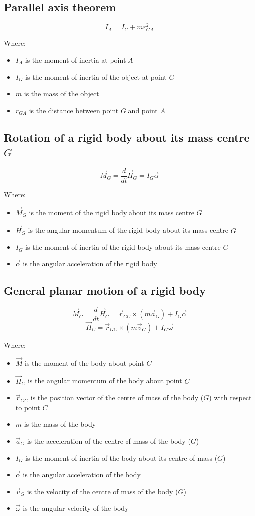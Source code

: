 \documentclass[11pt]{article}
\begin{document}
\subsection{Parallel axis theorem}
\label{sec:org05a7bcc}
\[I_A = I_G + mr_{GA}^2\]

Where:
\begin{itemize}
\item \(I_A\) is the moment of inertia at point \(A\)
\item \(I_G\) is the moment of inertia of the object at point \(G\)
\item \(m\) is the mass of the object
\item \(r_{GA}\) is the distance between point \(G\) and point \(A\)
\end{itemize}
\subsection{Rotation of a rigid body about its mass centre \(G\)}
\label{sec:org32aa79b}
\[\vec{M}_G = \frac{d}{dt} \vec{H}_G = I_G \vec{\alpha}\]

Where:
\begin{itemize}
\item \(\vec{M}_G\) is the moment of the rigid body about its mass centre \(G\)
\item \(\vec{H}_G\) is the angular momentum of the rigid body about its mass centre \(G\)
\item \(I_G\) is the moment of inertia of the rigid body about its mass centre \(G\)
\item \(\vec{\alpha}\) is the angular acceleration of the rigid body
\end{itemize}
\subsection{General planar motion of a rigid body}
\label{sec:org5682ea9}
\[\vec{M}_C = \frac{d}{dt} \vec{H}_C = \vec{r}_{GC} \times (m \vec{a}_G) + I_G \vec{\alpha}\]
\[\vec{H}_C = \vec{r}_{GC} \times (m \vec{v}_G) + I_{G} \vec{\omega}\]

Where:
\begin{itemize}
\item \(\vec{M}\) is the moment of the body about point \(C\)
\item \(\vec{H}_C\) is the angular momentum of the body about point \(C\)
\item \(\vec{r}_{GC}\) is the position vector of the centre of mass of the body (\(G\)) with respect to point \(C\)
\item \(m\) is the mass of the body
\item \(\vec{a}_G\) is the acceleration of the centre of mass of the body (\(G\))
\item \(I_G\) is the moment of inertia of the body about its centre of mass (\(G\))
\item \(\vec{\alpha}\) is the angular acceleration of the body
\item \(\vec{v}_G\) is the velocity of the centre of mass of the body (\(G\))
\item \(\vec{\omega}\) is the angular velocity of the body
\end{itemize}
\end{document}
